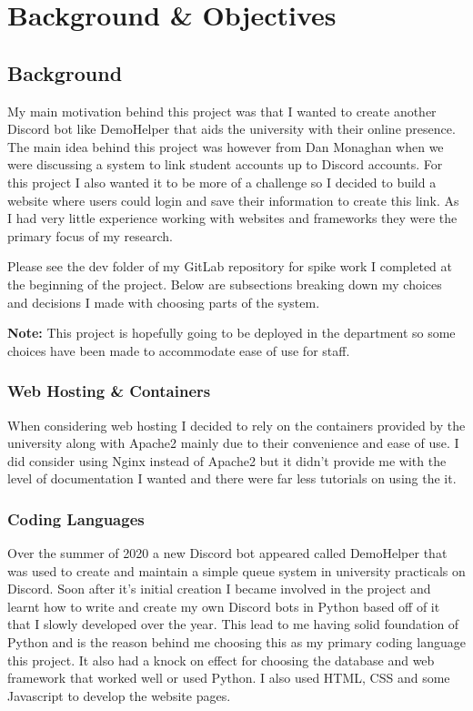 \chapter{Background \& Objectives} 

\section{Background}

My main motivation behind this project was that I wanted to create another Discord bot like DemoHelper \cite{demohelper} that aids the university with their online presence. The main idea behind this project was however from Dan Monaghan when we were discussing a system to link student accounts up to Discord accounts. For this project I also wanted it to be more of a challenge so I decided to build a website where users could login and save their information to create this link. As I had very little experience working with websites and frameworks they  were the primary focus of my research.

Please see the dev folder of my GitLab repository for spike work I completed at the beginning of the project. Below are subsections breaking down my choices and decisions I made with choosing parts of the system.

\textbf{Note:} This project is hopefully going to be deployed in the department so some choices have been made to accommodate ease of use for staff.

\subsection{Web Hosting \& Containers}
When considering web hosting I decided to rely on the containers provided by the university along with Apache2 \cite{apache2} mainly due to their convenience and ease of use. I did consider using Nginx instead of Apache2 but it didn't provide me with the level of documentation I wanted and there were far less tutorials on using the it.

\subsection{Coding Languages}
Over the summer of 2020 a new Discord bot appeared called DemoHelper \cite{demohelper} that was used to create and maintain a simple queue system in university practicals on Discord. Soon after it's initial creation I became involved in the project and learnt how to write and create my own Discord bots in Python based off of it that I slowly developed over the year. This lead to me having solid foundation of Python and is the reason behind me choosing this as my primary coding language this project. It also had a knock on effect for choosing the database and web framework that worked well or used Python. I also used HTML, CSS and some Javascript to develop the website pages.

